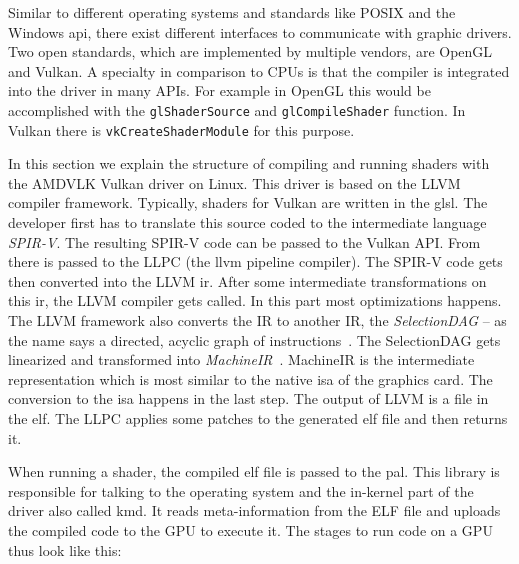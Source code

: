Similar to different operating systems and standards like POSIX and the Windows \gls{api}, there exist different interfaces to communicate with graphic drivers. Two open standards, which are implemented by multiple vendors, are OpenGL and Vulkan. A specialty in comparison to CPUs is that the compiler is integrated into the driver in many APIs. For example in OpenGL this would be accomplished with the \texttt{glShaderSource} and \texttt{glCompileShader} function. In Vulkan there is \texttt{vkCreateShaderModule} for this purpose.

In this section we explain the structure of compiling and running shaders with the AMDVLK Vulkan driver on Linux. This driver is based on the LLVM compiler framework. Typically, shaders for Vulkan are written in the \gls{glsl}. The developer first has to translate this source coded to the intermediate language \emph{SPIR-V}. The resulting SPIR-V code can be passed to the Vulkan API. From there is passed to the LLPC (the llvm pipeline compiler). The SPIR-V code gets then converted into the LLVM \gls{ir}. After some intermediate transformations on this \gls{ir}, the LLVM compiler gets called. In this part most optimizations happens.
The LLVM framework also converts the IR to another IR, the \emph{SelectionDAG} -- as the name says a directed, acyclic graph of instructions~\cite{llvmSelectionDag}. The SelectionDAG gets linearized and transformed into \emph{MachineIR}~\cite{llvmSelectionDag}. MachineIR is the intermediate representation which is most similar to the native \gls{isa} of the graphics card. The conversion to the \gls{isa} happens in the last step. The output of LLVM is a file in the \gls{elf}. The LLPC applies some patches to the generated \gls{elf} file and then returns it.

When running a shader, the compiled \gls{elf} file is passed to the \gls{pal}. This library is responsible for talking to the operating system and the in-kernel part of the driver also called \gls{kmd}. It reads meta-information from the ELF file and uploads the compiled code to the GPU to execute it. The stages to run code on a GPU thus look like this:

